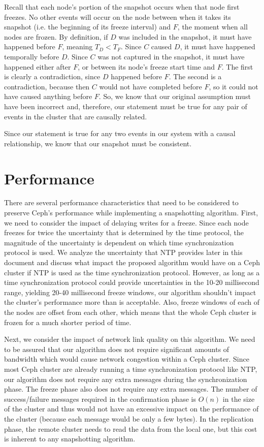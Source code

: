Recall that each node's portion of the snapshot occurs when that node
first freezes. No other events will occur on the node between when it
takes its snapshot (i.e. the beginning of its freeze interval) and
$F$, the moment when all nodes are frozen. By definition, if $D$ was
included in the snapshot, it must have happened before $F$, meaning
$T_D <T_F$. Since $C$ caused $D$, it must have happened temporally
before $D$.  Since $C$ was not captured in the snapshot, it must have
happened either after $F$, or between its node's freeze start time and
$F$. The first is clearly a contradiction, since $D$ happened before
$F$. The second is a contradiction, because then $C$ would not have
completed before $F$, so it could not have caused anything before
$F$. So, we know that our original assumption must have been incorrect
and, therefore, our statement must be true for any pair of events in
the cluster that are causally related.

Since our statement is true for any two events in our system with a
causal relationship, we know that our snapshot must be consistent.

\section{Performance}

There are several performance characteristics that need to be
considered to preserve Ceph's performance while implementing a
snapshotting algorithm. First, we need to consider the impact of
delaying writes for a freeze. Since each node freezes for twice the
uncertainty that is determined by the time protocol, the magnitude of
the uncertainty is dependent on which time synchronization protocol is
used. We analyze the uncertainty that NTP provides later in this
document and discuss what impact the proposed algorithm would have on a Ceph
cluster if NTP is used as the time synchronization protocol. However,
as long as a time synchronization protocol could provide uncertainties
in the 10-20 millisecond range, yielding 20-40 millisecond freeze %
windows, our algorithm shouldn't impact the cluster's performance
more than is acceptable. Also, freeze windows of each of the nodes are offset
from each other, which means that the whole Ceph cluster is frozen
for a much shorter period of time.

Next, we consider the impact of network link quality on this algorithm. We
need to be assured that our algorithm does not require significant
amounts of bandwidth which would cause network congestion within a
Ceph cluster. Since most Ceph cluster are already running a time
synchronization protocol like NTP, our algorithm does not require any
extra messages during the synchronization phase. The freeze phase also
does not require any extra messages. The number of success/failure
messages required in the confirmation phase is $O(n)$ in the size of
the cluster and thus would not have an excessive impact on the
performance of the cluster (because each message would be only a few
bytes). In the replication phase, the remote cluster needs to read
the data from the local one, but this cost is inherent to any
snapshotting algorithm.

